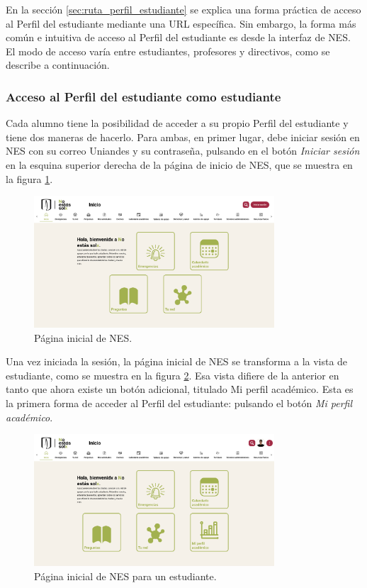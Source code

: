 En la sección \ref{sec:ruta_perfil_estudiante} se explica una forma práctica de acceso al Perfil del estudiante mediante una URL específica. Sin embargo, la forma más común e intuitiva de acceso al Perfil del estudiante es desde la interfaz de \gls{NES}. El modo de acceso varía entre estudiantes, profesores y directivos, como se describe a continuación.

\subsubsection{Acceso al Perfil del estudiante como estudiante}

Cada alumno tiene la posibilidad de acceder a su propio Perfil del estudiante y tiene dos maneras de hacerlo. Para ambas, en primer lugar, debe iniciar sesión en \gls{NES} con su correo Uniandes y su contraseña, pulsando en el botón \textit{Iniciar sesión} en la esquina superior derecha de la página de inicio de \gls{NES}, que se muestra en la figura \ref{fig:landing}.

\begin{figure}[H]
	\centering
	\includegraphics[width=0.8\textwidth]{assets/nes/landing.png}
	\caption{Página inicial de NES.}
	\label{fig:landing}
\end{figure}

Una vez iniciada la sesión, la página inicial de NES se transforma a la vista de estudiante, como se muestra en la figura \ref{fig:landing_estudiante}. Esa vista difiere de la anterior en tanto que ahora existe un botón adicional, titulado Mi perfil académico. Esta es la primera forma de acceder al Perfil del estudiante: pulsando el botón \textit{Mi perfil académico}.

\begin{figure}[H]
	\centering
	\includegraphics[width=0.8\textwidth]{assets/nes/landing_estudiante.png}
	\caption{Página inicial de NES para un estudiante.}
	\label{fig:landing_estudiante}
\end{figure}

